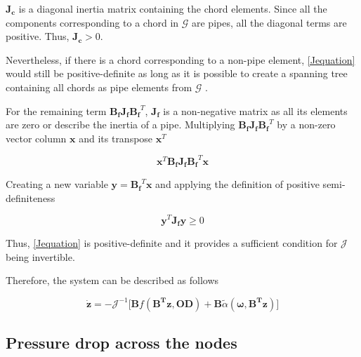 $\bm{J_c}$ is a diagonal inertia matrix containing the chord elements. Since all the components corresponding to a chord in $\bm{\mathcal{G}}$ are pipes, all the 
diagonal terms are positive. Thus, $\bm{J_c} > 0$. 

Nevertheless, if there is a chord corresponding to a non-pipe element, \eqref{Jequation} 
would still be positive-definite as long as it is possible to create a spanning tree containing all chords as pipe elements from $\bm{\mathcal{G}}$ \cite{TowerModel}.

For the remaining term $\bm{B_f J_f {B_f}}^T$, $\bm{J_f}$ is a non-negative matrix as all its elements are zero or describe the inertia of a pipe. 
Multiplying $\bm{B_f J_f {B_f}}^T$ by a non-zero vector column $\mathbf{x}$ and its transpose $\mathbf{x}^{T}$

\begin{equation}
  \bm{x}^{T} \bm{B_f J_f {B_f}}^T \bm{x}
  \label{PosDefi}
\end{equation}

Creating a new variable $\bm{y} = \bm{B_f}^T \mathbf{x}$ and applying the definition of positive semi-definiteness 
\cite{MatrixBook}

\begin{equation}
  \bm{y}^{T} \bm{J_f y} \geqslant 0
  \label{PosDefEq}
\end{equation}

Thus, \eqref{Jequation} is positive-definite and it provides a sufficient condition for $\bm{\mathcal{J}}$ being invertible. 

Therefore, the system can be described as follows

\begin{equation}
   \bm{\dot{z}} = -\bm{\mathcal{J}}^{-1} \Big[ \bm{B} f(\bm{B^T}\bm{z}, \bm{OD}) + \bm{B}\tilde{\alpha} (\bm{\omega},\bm{B^T}\bm{z}) \Big ]
   \label{ParatModelFinal}
 \end{equation}

\subsection{Pressure drop across the nodes}
\label{ModelRelationSection}



